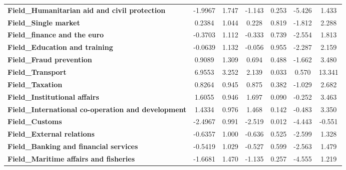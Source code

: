\documentclass[ 11pt]{article}
\begin{document}
\begin{center}
\begin{longtable}{lcccccc}
\textbf{Field\_Humanitarian aid and civil protection}      &      -1.9967  &        1.747     &    -1.143  &         0.253        &       -5.426    &        1.433     \\
\textbf{Field\_Single market}                              &       0.2384  &        1.044     &     0.228  &         0.819        &       -1.812    &        2.288     \\
\textbf{Field\_finance and the euro}                       &      -0.3703  &        1.112     &    -0.333  &         0.739        &       -2.554    &        1.813     \\
\textbf{Field\_Education and training}                     &      -0.0639  &        1.132     &    -0.056  &         0.955        &       -2.287    &        2.159     \\
\textbf{Field\_Fraud prevention}                           &       0.9089  &        1.309     &     0.694  &         0.488        &       -1.662    &        3.480     \\
\textbf{Field\_Transport}                                  &       6.9553  &        3.252     &     2.139  &         0.033        &        0.570    &       13.341     \\
\textbf{Field\_Taxation}                                   &       0.8264  &        0.945     &     0.875  &         0.382        &       -1.029    &        2.682     \\
\textbf{Field\_Institutional affairs}                      &       1.6055  &        0.946     &     1.697  &         0.090        &       -0.252    &        3.463     \\
\textbf{Field\_International co-operation and development} &       1.4334  &        0.976     &     1.468  &         0.142        &       -0.483    &        3.350     \\
\textbf{Field\_Customs}                                    &      -2.4967  &        0.991     &    -2.519  &         0.012        &       -4.443    &       -0.551     \\
\textbf{Field\_External relations}                         &      -0.6357  &        1.000     &    -0.636  &         0.525        &       -2.599    &        1.328     \\
\textbf{Field\_Banking and financial services}             &      -0.5419  &        1.029     &    -0.527  &         0.599        &       -2.563    &        1.479     \\
\textbf{Field\_Maritime affairs and fisheries}             &      -1.6681  &        1.470     &    -1.135  &         0.257        &       -4.555    &        1.219     \\

\end{longtable}
\end{center}
\end{document}
